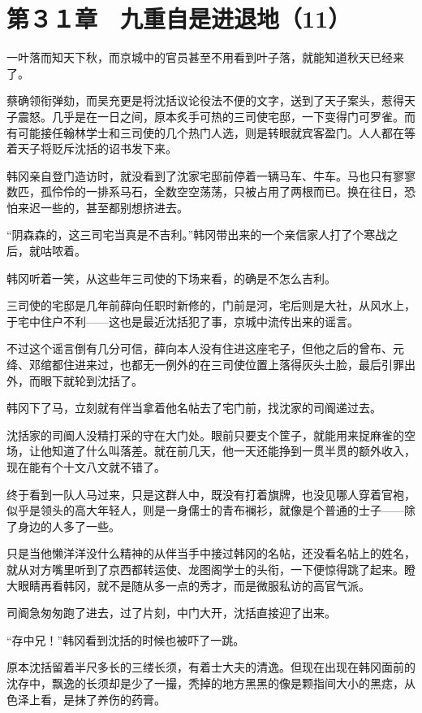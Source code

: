 \section{第３１章　九重自是进退地（11）}

一叶落而知天下秋，而京城中的官员甚至不用看到叶子落，就能知道秋天已经来了。

蔡确领衔弹劾，而吴充更是将沈括议论役法不便的文字，送到了天子案头，惹得天子震怒。几乎是在一日之间，原本炙手可热的三司使宅邸，一下变得门可罗雀。而有可能接任翰林学士和三司使的几个热门人选，则是转眼就宾客盈门。人人都在等着天子将贬斥沈括的诏书发下来。

韩冈亲自登门造访时，就没看到了沈家宅邸前停着一辆马车、牛车。马也只有寥寥数匹，孤伶伶的一排系马石，全数空空荡荡，只被占用了两根而已。换在往日，恐怕来迟一些的，甚至都别想挤进去。

“阴森森的，这三司宅当真是不吉利。”韩冈带出来的一个亲信家人打了个寒战之后，就咕哝着。

韩冈听着一笑，从这些年三司使的下场来看，的确是不怎么吉利。

三司使的宅邸是几年前薛向任职时新修的，门前是河，宅后则是大社，从风水上，于宅中住户不利——这也是最近沈括犯了事，京城中流传出来的谣言。

不过这个谣言倒有几分可信，薛向本人没有住进这座宅子，但他之后的曾布、元绛、邓绾都住进来过，也都无一例外的在三司使位置上落得灰头土脸，最后引罪出外，而眼下就轮到沈括了。

韩冈下了马，立刻就有伴当拿着他名帖去了宅门前，找沈家的司阍递过去。

沈括家的司阍人没精打采的守在大门处。眼前只要支个筐子，就能用来捉麻雀的空场，让他知道了什么叫落差。就在前几天，他一天还能挣到一贯半贯的额外收入，现在能有个十文八文就不错了。

终于看到一队人马过来，只是这群人中，既没有打着旗牌，也没见哪人穿着官袍，似乎是领头的高大年轻人，则是一身儒士的青布襕衫，就像是个普通的士子——除了身边的人多了一些。

只是当他懒洋洋没什么精神的从伴当手中接过韩冈的名帖，还没看名帖上的姓名，就从对方嘴里听到了京西都转运使、龙图阁学士的头衔，一下便惊得跳了起来。瞪大眼睛再看韩冈，就不是随从多一点的秀才，而是微服私访的高官气派。

司阍急匆匆跑了进去，过了片刻，中门大开，沈括直接迎了出来。

“存中兄！”韩冈看到沈括的时候也被吓了一跳。

原本沈括留着半尺多长的三缕长须，有着士大夫的清逸。但现在出现在韩冈面前的沈存中，飘逸的长须却是少了一撮，秃掉的地方黑黑的像是颗指间大小的黑痣，从色泽上看，是抹了养伤的药膏。


